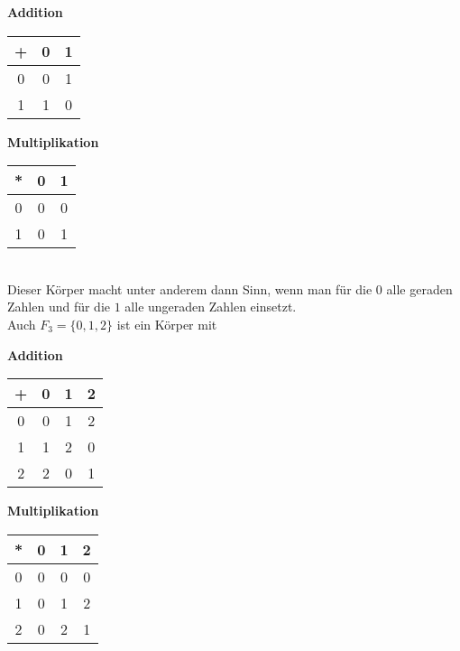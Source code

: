 \documentclass{article}
\begin{document}
\begin{minipage}{.45\textwidth}
  \textbf{Addition} \\
  
  \begin{tabular}{ c | c c }
    + & 0 & 1 \\
    \hline
    0 & 0 & 1 \\
    1 & 1 & 0 \\
  \end{tabular}
\end{minipage}
\hfill
\vrule
\hfill
\begin{minipage}{.45\textwidth}
  \textbf{Multiplikation} \\
  
  \begin{tabular}{ c | c c }
    * & 0 & 1 \\
    \hline
    0 & 0 & 0 \\
    1 & 0 & 1 \\
  \end{tabular}
\end{minipage}
\\

Dieser Körper macht unter anderem dann Sinn, wenn man für die $0$ alle geraden Zahlen und für die $1$
alle ungeraden Zahlen einsetzt. \\

Auch $F_3 = \{ 0, 1, 2 \}$ ist ein Körper mit \\

\begin{minipage}{.45\textwidth}
  \textbf{Addition} \\
  
  \begin{tabular}{ c | c c c }
    + & 0 & 1 & 2 \\
    \hline
    0 & 0 & 1 & 2 \\
    1 & 1 & 2 & 0 \\
    2 & 2 & 0 & 1 \\
  \end{tabular}
\end{minipage}
\hfill
\vrule
\hfill
\begin{minipage}{.45\textwidth}
  \textbf{Multiplikation} \\
  
  \begin{tabular}{ c | c c c}
    * & 0 & 1 & 2 \\
    \hline
    0 & 0 & 0 & 0 \\
    1 & 0 & 1 & 2 \\
    2 & 0 & 2 & 1 \\
  \end{tabular}
\end{minipage}
\\
\end{document}

